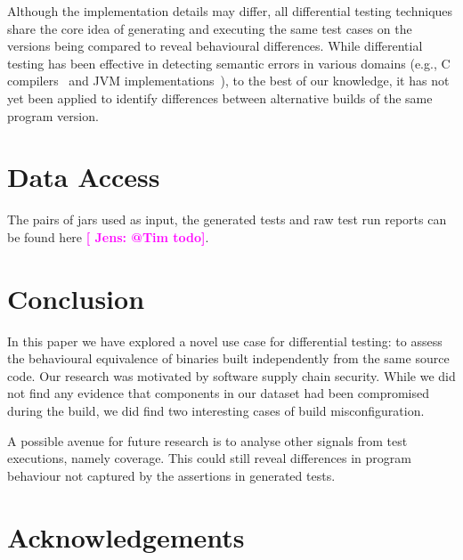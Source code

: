 \documentclass[conference]{IEEEtran}
\newcommand{\jens}[1]{\textbf{\textcolor{magenta}{[ \ding{46}Jens: #1]}}}
\begin{document}
Although the implementation details may differ, all differential testing techniques share the core idea of generating and executing the same test cases on the versions being compared to reveal behavioural differences. %
While differential testing has been effective in detecting semantic errors in various domains (e.g., C compilers~\cite{Yang:compiler:pldi:2011} and JVM implementations~\cite{Chen:jvmdiff:pldi:2016}), to the best of our knowledge, it has not yet been applied to identify differences between alternative builds of the same program version.


\section{Data Access}
\label{sec:dataaccess}

The pairs of jars used as input, the generated tests and raw test run reports can be found here \jens{@Tim todo}. 


\section{Conclusion}
\label{sec:conclusion}

In this paper we have explored a novel use case for differential testing: to assess the behavioural equivalence of binaries built independently from the same source code. Our research was motivated by software supply chain security. While we did not find any evidence that components in our dataset had been compromised during the build, we did find two interesting cases of build misconfiguration.  

A possible avenue for future research is to analyse other signals from test executions, namely coverage. This could still reveal differences in program behaviour not captured by the assertions in generated tests. 

\section*{Acknowledgements}




\end{document}
